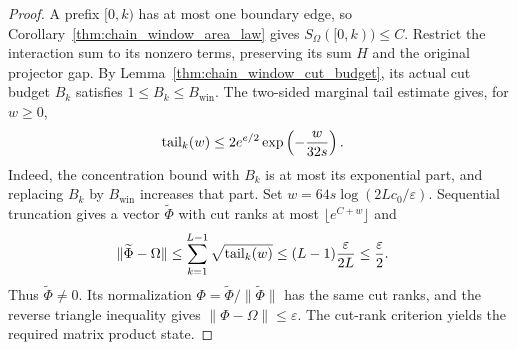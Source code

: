 \begin{proof}
    \leanok
    A prefix $[0,k)$ has at most one boundary edge, so
    Corollary~\ref{thm:chain_window_area_law} gives $S_\Omega([0,k))\le C$.
    Restrict the interaction sum to its nonzero terms, preserving its
    sum $H$ and the original projector gap. By
    Lemma~\ref{thm:chain_window_cut_budget}, its actual cut budget
    $B_k$ satisfies $1\le B_k\le B_{\mathrm{win}}$. The two-sided
    marginal tail estimate gives, for $w\ge0$,
    \begin{align}
        \operatorname{tail}_k(w)
         & \le 2e^{e/2}\exp\left(-\frac{w}{32s}\right).\notag
    \end{align}
    Indeed, the concentration bound with $B_k$ is at most its exponential
    part, and replacing $B_k$ by $B_{\mathrm{win}}$ increases that part.
    Set $w=64s\log(2Lc_0/\varepsilon)$. Sequential truncation gives a vector
    $\widetilde\Phi$ with cut ranks at most $\lfloor e^{C+w}\rfloor$ and
    \begin{align}
        \|\widetilde\Phi-\Omega\|
         & \le\sum_{k=1}^{L-1}\sqrt{\operatorname{tail}_k(w)}
        \le(L-1)\frac{\varepsilon}{2L}\le\frac\varepsilon2.\notag
    \end{align}
    Thus $\widetilde\Phi\ne0$. Its normalization
    $\Phi=\widetilde\Phi/\|\widetilde\Phi\|$ has the same cut ranks, and
    the reverse triangle inequality gives $\|\Phi-\Omega\|\le\varepsilon$.
    The cut-rank criterion yields the required matrix product state.
\end{proof}

